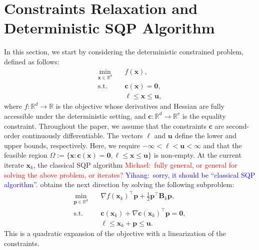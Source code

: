 \documentclass[aos]{imsart}
\numberwithin{equation}{section}
\theoremstyle{plain}
\newcommand{\michael}[1]{\textcolor{red}{Michael:\ #1}}
\newcommand{\yihang}[1]{\textcolor{blue}{Yihang:\ #1}}
\begin{document}
\section{Constraints Relaxation and Deterministic SQP Algorithm}
\label{sec:constraint_relaxation}
In this section, we start by considering the deterministic constrained problem, defined as follows:
\begin{equation}
\label{original_det_problem}
    \begin{split}
        \min_{\bm{x} \in \mathbb{R}^{d}} & \hspace{1em} f(\bm{x}), \\
        \text{s.t.} & \hspace{1em} \bm{c}(\bm{x}) = \bm{0},\\
        & \hspace{1em} \bm{\ell} \leq \bm{x} \leq \bm{u},
    \end{split}
\end{equation}
where $f: \mathbb{R}^{d} \to \mathbb{R}$ is the objective whose derivatives and Hessian are fully accessible under the deterministic setting, and  $\bm{c}: \mathbb{R}^{d} \to \mathbb{R}^{r}$ is the equality constraint. Throughout the paper, we assume that the constraints $\bm{c}$ are second-order continuously differentiable. 
The vectors $\bm{\ell}$ and $\bm{u}$ define the lower and upper bounds, respectively.
Here, we require $-\infty < \bm{\ell} < \bm{u} < \infty$ and that the feasible region $\Omega := \{\bm{x}: \bm{c}(\bm{x}) = \bm{0}, \bm{\ell} \leq \bm{x} \leq \bm{u}\}$ is non-empty. 
At the current iterate $\bm{x}_k$, the classical SQP algorithm 
\michael{fully general, or general for solving the above problem, or iterates?}
\yihang{sorry, it should be ``classical SQP algorithm''.}
obtains the next direction
by solving the following subproblem:
\begin{equation}
\label{original_sqp_subproblem}
    \begin{split}
        \min_{\bm{p} \in \mathbb{R}^{d}} & \hspace{1em}  \nabla f(\bm{x}_k)^{\top}\bm{p}+ \frac{1}{2}\bm{p}^{\top}\bm{B}_k\bm{p},\\
        \text{s.t.} & \hspace{1em} \bm{c}(\bm{x}_k)+\nabla \bm{c}(\bm{x}_k)^{\top}\bm{p} = \bm{0},\\
        & \hspace{1em} \bm{\ell} \leq \bm{x}_k + \bm{p} \leq \bm{u} .
    \end{split}    
\end{equation}
This is a quadratic expansion of the objective with a linearization of the constraints.
\end{document}

